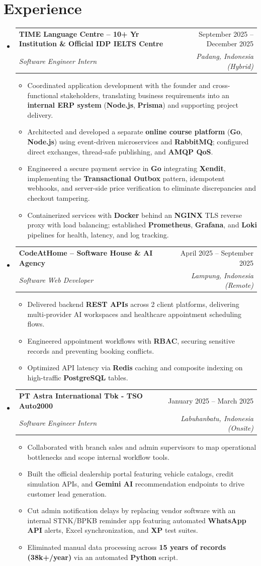 \documentclass[letterpaper,11pt]{article}
\makeatletter
\newcommand{\resumeItem}[1]{\item\small{#1}}
\newcommand{\resumeSubheading}[4]{
  \item
    \begin{tabular*}{\textwidth}[t]{l@{\extracolsep{\fill}}r}
      \textbf{#1} & #2 \\
      \textit{\small#3} & \textit{\small #4} \\
    \end{tabular*}\vspace{-2pt}
}
\newcommand{\resumeSubHeadingListStart}{\begin{itemize}[leftmargin=0in, label={}, itemsep=0.5pt, parsep=0pt, topsep=0.2pt]}
\newcommand{\resumeSubHeadingListEnd}{\end{itemize}\vspace{-2pt}}
\newcommand{\resumeItemListStart}{\begin{itemize}[leftmargin=12pt, label=\tiny$\bullet$, itemsep=0.5pt, parsep=0pt, topsep=0.2pt]}
\newcommand{\resumeItemListEnd}{\end{itemize}}
\makeatother
\begin{document}
\section{Experience}
  \resumeSubHeadingListStart
    \resumeSubheading
      {TIME Language Centre \textnormal{\small -- 10+ Yr Institution \& Official IDP IELTS Centre}}{September 2025 -- December 2025}
      {Software Engineer Intern}{Padang, Indonesia (Hybrid)}
      \resumeItemListStart
        \resumeItem{Coordinated application development with the founder and cross-functional stakeholders, translating business requirements into an \textbf{internal ERP system} (\textbf{Node.js}, \textbf{Prisma}) and supporting project delivery.}
        \resumeItem{Architected and developed a separate \textbf{online course platform} (\textbf{Go}, \textbf{Node.js}) using event-driven microservices and \textbf{RabbitMQ}; configured direct exchanges, thread-safe publishing, and \textbf{AMQP QoS}.}
        \resumeItem{Engineered a secure payment service in \textbf{Go} integrating \textbf{Xendit}, implementing the \textbf{Transactional Outbox} pattern, idempotent webhooks, and server-side price verification to eliminate discrepancies and checkout tampering.}
        \resumeItem{Containerized services with \textbf{Docker} behind an \textbf{NGINX} TLS reverse proxy with load balancing; established \textbf{Prometheus}, \textbf{Grafana}, and \textbf{Loki} pipelines for health, latency, and log tracking.}
      \resumeItemListEnd 

    \resumeSubheading
      {CodeAtHome \textnormal{\small -- Software House \& AI Agency}}{April 2025 -- September 2025}
      {Software Web Developer}{Lampung, Indonesia (Remote)}
      \resumeItemListStart
        \resumeItem{Delivered backend \textbf{REST APIs} across 2 client platforms, delivering multi-provider AI workspaces and healthcare appointment scheduling flows.}
        \resumeItem{Engineered appointment workflows with \textbf{RBAC}, securing sensitive records and preventing booking conflicts.}
        \resumeItem{Optimized API latency via \textbf{Redis} caching and composite indexing on high-traffic \textbf{PostgreSQL} tables.}
      \resumeItemListEnd

    \resumeSubheading
      {PT Astra International Tbk - TSO Auto2000}{January 2025 -- March 2025}
      {Software Engineer Intern}{Labuhanbatu, Indonesia (Onsite)}
      \resumeItemListStart
        \resumeItem{Collaborated with branch sales and admin supervisors to map operational bottlenecks and scope internal workflow tools.}
        \resumeItem{Built the official dealership portal featuring vehicle catalogs, credit simulation APIs, and \textbf{Gemini AI} recommendation endpoints to drive customer lead generation.}
        \resumeItem{Cut admin notification delays by replacing vendor software with an internal STNK/BPKB reminder app featuring automated \textbf{WhatsApp API} alerts, Excel synchronization, and \textbf{XP} test suites.}
        \resumeItem{Eliminated manual data processing across \textbf{15 years of records (38k+/year)} via an automated \textbf{Python} script.}
      \resumeItemListEnd
  \resumeSubHeadingListEnd
\end{document}
